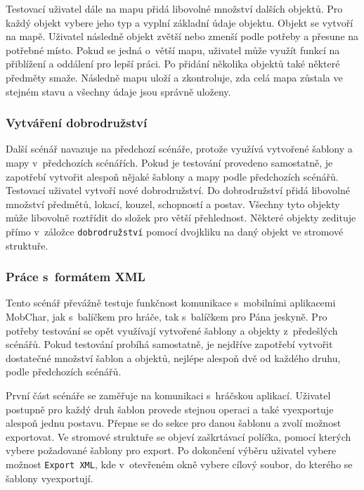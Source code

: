 \documentclass[thesis=B,czech]{resources/FITthesis}[2012/06/26]
\begin{document}
Testovací uživatel dále na mapu přidá libovolné množství dalších objektů. Pro každý objekt vybere jeho typ a vyplní základní údaje objektu. Objekt se vytvoří na mapě. Uživatel následně objekt zvětší nebo zmenší podle potřeby a přesune na potřebné místo. Pokud se jedná o~větší mapu, uživatel může využít funkcí na přiblížení a oddálení pro lepší práci. Po přidání několika objektů také některé předměty smaže. Následně mapu uloží a zkontroluje, zda celá mapa zůstala ve stejném stavu a všechny údaje jsou správně uloženy.

\subsubsection{Vytváření dobrodružství}
Další scénář navazuje na předchozí scénáře, protože využívá vytvořené šablony a mapy v~předchozích scénářích. Pokud je testování provedeno samostatně, je zapotřebí vytvořit alespoň nějaké šablony a mapy podle předchozích scénářů. Testovací uživatel vytvoří nové dobrodružství. Do dobrodružství přidá libovolné množství předmětů, lokací, kouzel, schopností a postav. Všechny tyto objekty může libovolně roztřídit do složek pro větší přehlednost. Některé objekty zedituje přímo v~záložce \texttt{dobrodružství} pomocí dvojkliku na daný objekt ve stromové struktuře.

\subsubsection{Práce s~formátem XML}
Tento scénář převážně testuje funkčnost komunikace s~mobilními aplikacemi MobChar, jak s~balíčkem pro hráče, tak s~balíčkem pro Pána jeskyně. Pro potřeby testování se opět využívají vytvořené šablony a objekty z~předešlých scénářů. Pokud testování probíhá samostatně, je nejdříve zapotřebí vytvořit dostatečné množství šablon a objektů, nejlépe alespoň dvě od každého druhu, podle předchozích scénářů. \par

První část scénáře se zaměřuje na komunikaci s~hráčskou aplikací. Uživatel postupně pro každý druh šablon provede stejnou operaci a také vyexportuje alespoň jednu postavu. Přepne se do sekce pro danou šablonu a zvolí možnost exportovat. Ve stromové struktuře se objeví zaškrtávací políčka, pomocí kterých vybere požadované šablony pro export. Po dokončení výběru uživatel vybere možnost \texttt{Export XML}, kde v~otevřeném okně vybere cílový soubor, do kterého se šablony vyexportují. \par
\end{document}
